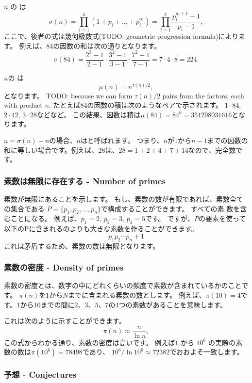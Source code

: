 $n$ の  は
\[\sigma(n)=\prod_{i=1}^k (1+p_i+\ldots+p_i^{\alpha_i}) = \prod_{i=1}^k \frac{p_i^{a_i+1}-1}{p_i-1},\]
ここで、後者の式は幾何級数式(TODO: geometric progression formula)によります。
例えば、84の因数の和は次の通りとなります。
\[\sigma(84)=\frac{2^3-1}{2-1} \cdot \frac{3^2-1}{3-1} \cdot \frac{7^2-1}{7-1} = 7 \cdot 4 \cdot 8 = 224.\]

$n$の  は
\[\mu(n)=n^{\tau(n)/2},\]
となります。
TODO:  because we can form $\tau(n)/2$ pairs from the factors,
each with product $n$.
たとえば84の因数の積は次のようなペアで示されます。
$1 \cdot 84$, $2 \cdot 42$, $3 \cdot 28$などなど。
この結果、因数は積は$\mu(84)=84^6=351298031616$となります。

$n=\sigma(n)-n$の場合、$n$はと呼ばれます。
つまり、$n$が$1$から$n - 1$までの因数の和に等しい場合です。例えば、28は、$28=1+2+4+7+14$なので、完全数です。

\subsubsection{素数は無限に存在する - Number of primes}

素数が無限にあることを示します。
もし、素数の数が有限であれば、素数全ての集合である
$P=\{p_1,p_2,\ldots,p_n\}$で構成することができます。
すべての素 数を含むことになる。
例えば、$p_1=2$, $p_2=3$, $p_3=5$です。
ですが、$P$の要素を使って以下のPに含まれるのよりも大きな素数を作ることができます。
\[p_1 p_2 \cdots p_n+1\]
これは矛盾するため、素数の数は無限となります。

\subsubsection{素数の密度 - Density of primes}

素数の密度とは、数字の中にどれくらいの頻度で素数が含まれているかのことです。
$\pi(n)$を1から$N$までに含まれる素数の数とします。
例えば、$\pi(10)=4$です。1から10までの間に$2、3、5、7$の4つの素数があることを意味します。

これは次のように示すことができます。
\[\pi(n) \approx \frac{n}{\ln n},\]
この式からわかる通り、素数の密度は高いです。
例えば$1$ から $10^6$ の実際の素数の数は$\pi(10^6)=78498$であり、
$10^6 / \ln 10^6 \approx 72382$でおおよそ一致します。

\subsubsection{予想 - Conjectures}

